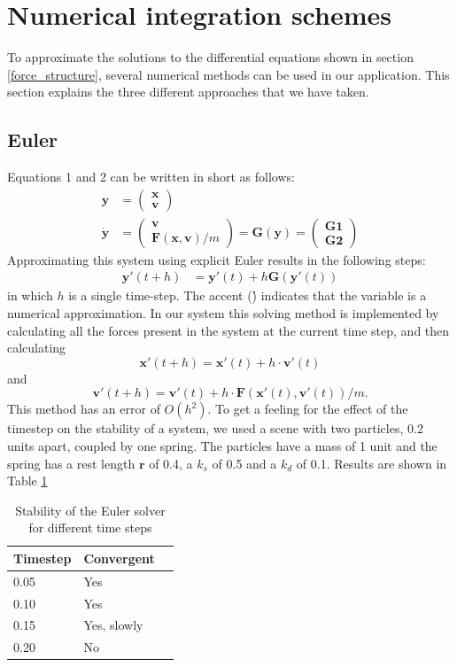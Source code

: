 \documentclass[a4paper,twoside,11pt,twocolumn]{article}
\begin{document}
\section{Numerical integration schemes}
\label{Numerical_schemes}
To approximate the solutions to the differential equations shown in section \ref{force_structure}, several numerical methods can be used in our application. This section explains the three different approaches that we have taken.
\subsection{Euler}
Equations 1 and 2 can be written in short as follows:
\begin{align}
	\mathbf{y} &= \begin{pmatrix}\mathbf{x}\\\mathbf{v}\end{pmatrix}\\
	\dot{\mathbf{y}} &= \begin{pmatrix}\mathbf{v}\\\mathbf{F}(\mathbf{x}, \mathbf{v})/m\end{pmatrix} = \mathbf{G}(\mathbf{y}) = \begin{pmatrix}\mathbf{G1}\\\mathbf{G2}\end{pmatrix}
\end{align}
Approximating this system using explicit Euler results in the following steps:
\begin{align}
	\mathbf{y}'(t+h) &= \mathbf{y}'(t) + h\mathbf{G}(\mathbf{y}'(t))
\end{align}
in which $h$ is a single time-step. The accent (\') indicates that the variable is a numerical approximation. In our system this solving method is implemented by calculating all the forces present in the system at the current time step, and then calculating \[\mathbf{x}'(t+h) = \mathbf{x}'(t) + h\cdot \mathbf{v}'(t)\] and \[\mathbf{v}'(t+h) = \mathbf{v}'(t) + h\cdot \mathbf{F}(\mathbf{x}'(t), \mathbf{v}'(t))/m.\] This method has an error of $O(h^2)$. 
To get a feeling for the effect of the timestep on the stability of a system, we used a scene with two particles, 0.2 units apart, coupled by one spring. The particles have a mass of 1 unit and the spring has a rest length $\mathbf{r}$ of 0.4, a $k_s$ of 0.5 and a $k_d$ of 0.1. Results are shown in Table \ref{Euler}

\begin{table}[h]
	\caption{Stability of the Euler solver for different time steps}
	\label{Euler}
	\begin{tabular}{|l|l|l|}
		\hline
		\textbf{Timestep} & \textbf{Convergent} \\ \hline
		0.05              & Yes                 \\ \hline
		0.10              & Yes                 \\ \hline
		0.15              & Yes, slowly         \\ \hline
		0.20              & No                  \\ \hline
	\end{tabular}
\end{table}
\end{document}
